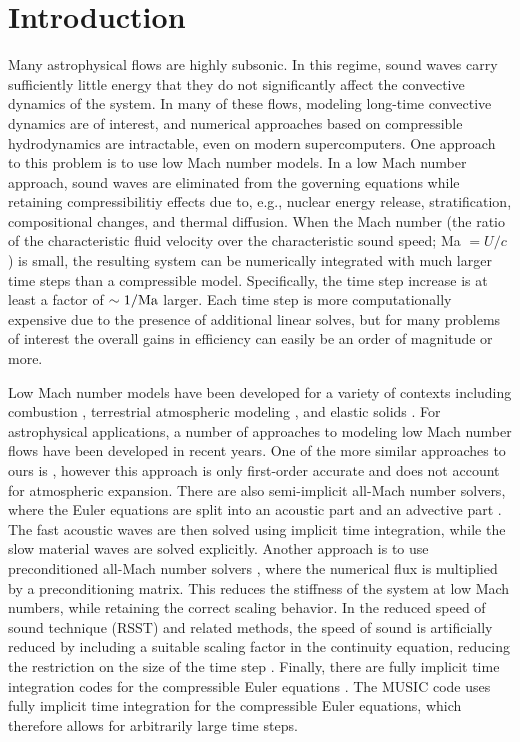 \documentclass{aastex62}
\begin{document}
\section{Introduction} \label{sec:intro}
Many astrophysical flows are highly subsonic.  In this regime,
sound waves carry sufficiently little energy that they do not
significantly affect the convective dynamics of the system.  In many
of these flows, modeling long-time convective dynamics are of
interest, and numerical approaches based on compressible hydrodynamics
are intractable, even on modern supercomputers.  One approach to this
problem is to use low Mach number models.  In a low Mach number
approach, sound waves are eliminated from the governing equations
while retaining compressibilitiy effects due to, e.g., nuclear energy
release, stratification, compositional changes, and thermal diffusion.  When the Mach
number (the ratio of the characteristic fluid velocity over the
characteristic sound speed; Ma $= U/c$) is small, the resulting system
can be numerically integrated with much larger time steps than a
compressible model.  Specifically, the time step increase is at least
a factor of $\sim 1/{\rm Ma}$ larger.  Each time step is more
computationally expensive due to the presence of additional linear
solves, but for many problems of interest the overall gains in
efficiency can easily be an order of magnitude or more.

Low Mach number models have been developed for a variety of contexts
including combustion \citep{day2000numerical}, terrestrial atmospheric
modeling \citep{durran:1989,oneill:2014,duarte2015low}, and elastic
solids \citep{abbate2017all}.  For astrophysical applications, a
number of approaches to modeling low Mach number flows have been
developed in recent years.  One of the more similar approaches to ours is
\cite{Lin:2006}, however this approach is only first-order accurate and does
not account for atmospheric expansion.  There are also semi-implicit all-Mach
number solvers, where the Euler equations are split into an acoustic
part and an advective part
\citep{Kwatra2009,Degond2009,Cordier2012,Haack2012,Happenhofer2013,Chalons2016,Padioleau2019}.
The fast acoustic waves are then solved using implicit time
integration, while the slow material waves are solved explicitly.
Another approach is to use preconditioned all-Mach number solvers
\citep{Miczek2014,Barsukow2016}, where the numerical flux is
multiplied by a preconditioning matrix.  This reduces the stiffness of
the system at low Mach numbers, while retaining the correct scaling
behavior. In the reduced speed of sound technique (RSST) and related
methods, the speed of sound is artificially reduced by including a
suitable scaling factor in the continuity equation, reducing the
restriction on the size of the time step
\citep{Rempel2005,Hotta2012,Wang2015,Takeyama2017,Iijima2018}.
Finally, there are fully implicit time integration codes for the
compressible Euler equations
\citep{Viallet2011,kifonidis:2012,Viallet2015,Goffrey2016}.  The MUSIC code
uses fully implicit time integration for the compressible Euler
equations, which therefore allows for arbitrarily large time steps.
\end{document}
